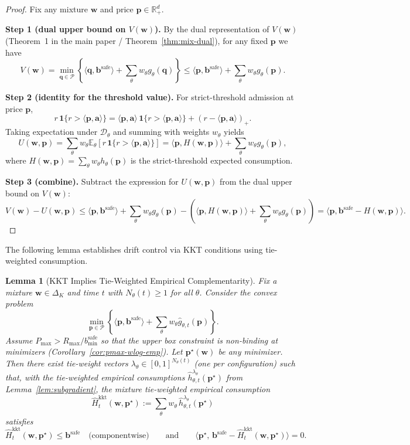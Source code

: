 \documentclass[11pt]{article}
\newtheorem{lemma}[theorem]{Lemma}
\newcommand{\bbS}{\mathbf{b}^{\mathrm{safe}}}
\newcommand{\ba}{\mathbf{a}}
\newcommand{\bp}{\mathbf{p}}
\newcommand{\bw}{\mathbf{w}}
\newcommand{\E}{\mathbb{E}}
\newcommand{\R}{\mathbb{R}}
\newcommand{\cP}{\mathcal{P}}
\newcommand{\cD}{\mathcal{D}}
\begin{document}
\begin{proof}
Fix any mixture $\bw$ and price $\bp\in\R_+^d$.

\textbf{Step 1 (dual upper bound on $V(\bw)$).}
By the dual representation of $V(\bw)$ (Theorem~1 in the main paper / Theorem~\ref{thm:mix-dual}),
for any fixed $\bp$ we have
\[
V(\bw)
=
\min_{\boldsymbol{q}\in\cP}\left\{\langle \boldsymbol{q},\bbS\rangle+\sum_\theta w_\theta g_\theta(\boldsymbol{q})\right\}
\le
\langle \bp,\bbS\rangle+\sum_\theta w_\theta g_\theta(\bp).
\]

\textbf{Step 2 (identity for the threshold value).}
For strict-threshold admission at price $\bp$,
\[
r\,\mathbf{1}\{r>\langle \bp,\ba\rangle\}
=
\langle \bp,\ba\rangle\,\mathbf{1}\{r>\langle \bp,\ba\rangle\}
+
(r-\langle \bp,\ba\rangle)_+.
\]
Taking expectation under $\cD_\theta$ and summing with weights $w_\theta$ yields
\[
U(\bw,\bp)
=
\sum_\theta w_\theta \E_\theta\!\left[r\,\mathbf{1}\{r>\langle \bp,\ba\rangle\}\right]
=
\langle \bp, H(\bw,\bp)\rangle + \sum_\theta w_\theta g_\theta(\bp),
\]
where $H(\bw,\bp)=\sum_\theta w_\theta h_\theta(\bp)$ is the strict-threshold expected consumption.

\textbf{Step 3 (combine).}
Subtract the expression for $U(\bw,\bp)$ from the dual upper bound on $V(\bw)$:
\[
V(\bw)-U(\bw,\bp)
\le
\langle \bp,\bbS\rangle+\sum_\theta w_\theta g_\theta(\bp)
-
\left(\langle \bp,H(\bw,\bp)\rangle+\sum_\theta w_\theta g_\theta(\bp)\right)
=
\langle \bp,\bbS-H(\bw,\bp)\rangle.
\]
\end{proof}

The following lemma establishes drift control via KKT conditions using tie-weighted consumption.

\begin{lemma}[KKT Implies Tie-Weighted Empirical Complementarity]
\label{lem:kkt-feasibility}
Fix a mixture $\bw\in\Delta_K$ and time $t$ with $N_\theta(t)\ge 1$ for all $\theta$.
Consider the convex problem
\[
\min_{\bp\in\cP}\left\{\langle \bp,\bbS\rangle+\sum_{\theta}w_\theta \widehat g_{\theta,t}(\bp)\right\}.
\]
Assume $P_{\max}> R_{\max}/b^{\mathrm{safe}}_{\min}$ so that the upper box constraint is non-binding at minimizers
(Corollary~\ref{cor:pmax-wlog-emp}).
Let $\bp^\star(\bw)$ be any minimizer.
Then there exist tie-weight vectors $\lambda_\theta\in[0,1]^{N_\theta(t)}$ (one per configuration) such that,
with the tie-weighted empirical consumptions $\widehat h_{\theta,t}^{\lambda_\theta}(\bp^\star)$ from
Lemma~\ref{lem:subgradient}, the mixture tie-weighted empirical consumption
\[
\widehat H_t^{\mathrm{kkt}}(\bw,\bp^\star)
:=\sum_{\theta} w_\theta\,\widehat h_{\theta,t}^{\lambda_\theta}(\bp^\star)
\]
satisfies
\[
\widehat H_t^{\mathrm{kkt}}(\bw,\bp^\star)\le \bbS\quad\text{(componentwise)}
\qquad\text{and}\qquad
\langle \bp^\star,\,\bbS-\widehat H_t^{\mathrm{kkt}}(\bw,\bp^\star)\rangle=0.
\]
\end{lemma}
\end{document}
